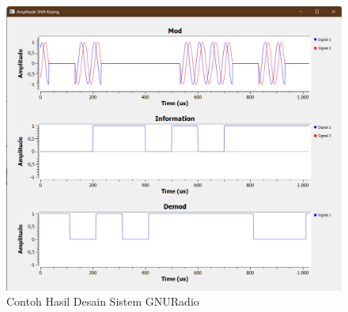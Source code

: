 \begin{figure}
	\begin{center}
		\includegraphics[scale=0.4]{pics/bab2/contohRunGRC.png} 
		\caption[Contoh Hasil Desain Sistem GNURadio]{Contoh Hasil Desain Sistem GNURadio}
		\label{pic:contohRunGRC}
	\end{center}
\end{figure}



